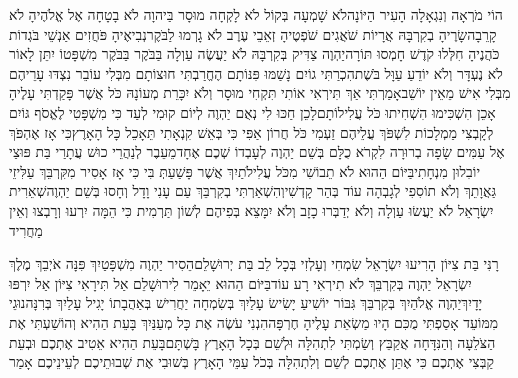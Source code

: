 \documentclass[../main/main.tex]{subfiles}
\begin{document}
\begin{multicols*}{\ncols}
הוֹי מֹרְאָה וְנִגְאָלָה הָעִיר הַיּוֹנָה\PreVerseSpace{}לֹא שָׁמְעָה בְּקוֹל לֹא לָקְחָה מוּסָר בַּיהוָה לֹא בָטָחָה אֶל אֱלֹהֶיהָ לֹא קָרֵבָה\PreVerseSpace{}שָׂרֶיהָ בְקִרְבָּהּ אֲרָיוֹת שֹׁאֲגִים שֹׁפְטֶיהָ זְאֵבֵי עֶרֶב לֹא גָרְמוּ לַבֹּקֶר\PreVerseSpace{}נְבִיאֶיהָ פֹּחֲזִים אַנְשֵׁי בֹּגְדוֹת כֹּהֲנֶיהָ חִלְּלוּ קֹדֶשׁ חָמְסוּ תּוֹרָה\PreVerseSpace{}יַהְוֶה צַדִּיק בְּקִרְבָּהּ לֹא יַעֲשֶׂה עַוְלָה בַּבֹּקֶר בַּבֹּקֶר מִשְׁפָּטוֹ יִתֵּן לָאוֹר לֹא נֶעְדָּר וְלֹא יוֹדֵעַ עַוָּל בֹּשֶׁת\PreVerseSpace{}הִכְרַתִּי גוֹיִם נָשַׁמּוּ פִּנּוֹתָם הֶחֱרַבְתִּי חוּצוֹתָם מִבְּלִי עוֹבֵר נִצְדּוּ עָרֵיהֶם מִבְּלִי אִישׁ מֵאֵין יוֹשֵׁב\PreVerseSpace{}אָמַרְתִּי אַךְ תִּירְאִי אוֹתִי תִּקְחִי מוּסָר וְלֹא יִכָּרֵת מְעוֹנָהּ כֹּל אֲשֶׁר פָּקַדְתִּי עָלֶיהָ אָכֵן הִשְׁכִּימוּ הִשְׁחִיתוּ כֹּל עֲלִילוֹתָם\PreVerseSpace{}לָכֵן חַכּוּ לִי נְאֻם יַהְוֶה לְיוֹם קוּמִי לְעַד כִּי מִשְׁפָּטִי לֶאֱסֹף גּוֹיִם לְקָבְצִי מַמְלָכוֹת לִשְׁפֹּךְ עֲלֵיהֶם זַעְמִי כֹּל חֲרוֹן אַפִּי כִּי בְּאֵשׁ קִנְאָתִי תֵּאָכֵל כָּל הָאָרֶץ\PreVerseSpace{}כִּי אָז אֶהְפֹּךְ אֶל עַמִּים שָׂפָה בְרוּרָה לִקְרֹא כֻלָּם בְּשֵׁם יַהְוֶה לְעָבְדוֹ שְׁכֶם אֶחָד\PreVerseSpace{}מֵעֵבֶר לְנַהֲרֵי כוּשׁ עֲתָרַי בַּת פּוּצַי יוֹבִלוּן מִנְחָתִי\PreVerseSpace{}בַּיּוֹם הַהוּא לֹא תֵבוֹשִׁי מִכֹּל עֲלִילֹתַיִךְ אֲשֶׁר פָּשַׁעַתְּ בִּי כִּי אָז אָסִיר מִקִּרְבֵּךְ עַלִּיזֵי גַּאֲוָתֵךְ וְלֹא תוֹסִפִי לְגָבְהָה עוֹד בְּהַר קָדְשִׁי\PreVerseSpace{}וְהִשְׁאַרְתִּי בְקִרְבֵּךְ עַם עָנִי וָדָל וְחָסוּ בְּשֵׁם יַהְוֶה\PreVerseSpace{}שְׁאֵרִית יִשְׂרָאֵל לֹא יַעֲשׂוּ עַוְלָה וְלֹא יְדַבְּרוּ כָזָב וְלֹא יִמָּצֵא בְּפִיהֶם לְשׁוֹן תַּרְמִית כִּי הֵמָּה יִרְעוּ וְרָבְצוּ וְאֵין מַחֲרִיד\OpenSection{}\par
{}רָנִּי בַּת צִיּוֹן הָרִיעוּ יִשְׂרָאֵל שִׂמְחִי וְעָלְזִי בְּכָל לֵב בַּת יְרוּשָׁלֵם\PreVerseSpace{}הֵסִיר יַהְוֶה מִשְׁפָּטַיִךְ פִּנָּה אֹיְבֵךְ מֶלֶךְ יִשְׂרָאֵל יַהְוֶה בְּקִרְבֵּךְ לֹא תִירְאִי רָע עוֹד\PreVerseSpace{}בַּיּוֹם הַהוּא יֵאָמֵר לִירוּשָׁלֵם אַל תִּירָאִי צִיּוֹן אַל יִרְפּוּ יָדָיִךְ\PreVerseSpace{}יַהְוֶה אֱלֹהַיִךְ בְּקִרְבֵּךְ גִּבּוֹר יוֹשִׁיעַ יָשִׂישׂ עָלַיִךְ בְּשִׂמְחָה יַחֲרִישׁ בְּאַהֲבָתוֹ יָגִיל עָלַיִךְ בְּרִנָּה\PreVerseSpace{}נוּגֵי מִמּוֹעֵד אָסַפְתִּי מֻכִּם\SubEnd{} הָיוּ מַשְׂאֵת עָלֶיהָ חֶרְפָּה\PreVerseSpace{}הִנְנִי עֹשֶׂה אֶת כָּל מְעַנַּיִךְ בָּעֵת הַהִיא וְהוֹשַׁעְתִּי אֶת הַצֹּלֵעָה וְהַנִּדָּחָה אֲקַבֵּץ וְשַׂמְתִּי\SubEnd{} לִתְהִלָּה וּלְשֵׁם בְּכָל הָאָרֶץ בָּשְׁתָּם\PreVerseSpace{}בָּעֵת הַהִיא אֵטִיב\SubEnd{} אֶתְכֶם וּבְעֵת\SubEnd{} קַבְּצִי אֶתְכֶם כִּי אֶתֵּן אֶתְכֶם לְשֵׁם וְלִתְהִלָּה בְּכֹל עַמֵּי הָאָרֶץ בְּשׁוּבִי אֶת שְׁבוּתֵיכֶם לְעֵינֵיכֶם אָמַר \par
\end{multicols*}
\end{document}
